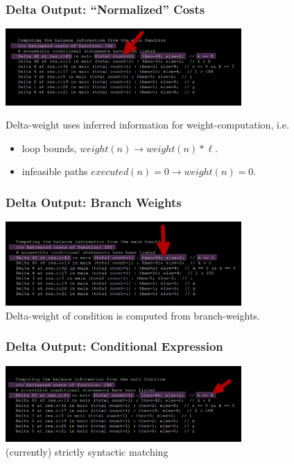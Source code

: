 \documentclass{beamer}
\begin{document}
\begin{frame}[fragile]
  \frametitle{Delta Output: ``Normalized'' Costs}

  \begin{center}
    \includegraphics[width=9cm]{img/dd3.pdf} \\
  \end{center}

  \bigskip
  Delta-weight uses inferred information for weight-computation, i.e.
  \begin{itemize}
    \item loop bounds, $\mathit{weight}(n) \rightarrow  \mathit{weight}(n) * \ell$.
    \item infeasible paths $\mathit{executed}(n) = 0 \rightarrow \mathit{weight}(n) = 0$.
  \end{itemize}
\end{frame} 



\begin{frame}[fragile]
  \frametitle{Delta Output: Branch Weights}

  \begin{center}
    \includegraphics[width=9cm]{img/dd4.pdf} \\

    \bigskip
    Delta-weight of condition is computed from branch-weights. 
  \end{center}
\end{frame} 



\begin{frame}[fragile]
  \frametitle{Delta Output: Conditional Expression}

  \begin{center}
    \includegraphics[width=9cm]{img/dd5.pdf} \\

    \bigskip
    (currently) strictly syntactic matching
  \end{center}
\end{frame} 
\end{document}

